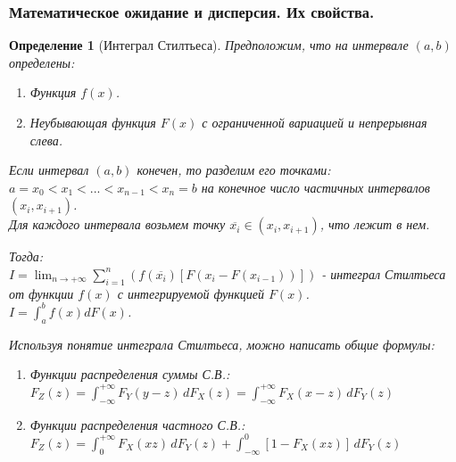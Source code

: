 \documentclass[14pt]{extarticle}
\theoremstyle{breakstyle}
\newtheorem{definition}{Определение}[subsection]
\begin{document}
\subsubsection{Математическое ожидание и дисперсия. Их свойства.}
\begin{definition}[Интеграл Стилтьеса]
Предположим, что на интервале $(a, b)$ определены:
\begin{enumerate}
    \item Функция $f(x)$.
    \item Неубывающая функция $F(x)$ с ограниченной вариацией и непрерывная слева.
\end{enumerate}

Если интервал $(a, b)$ конечен, то разделим его точками: $a = x_{0} < x_{1} < ... < x_{n-1} < x_{n} = b$ на конечное число частичных интервалов $(x_{i}, x_{i+1})$.\\
Для каждого интервала возьмем точку $\overline{x_{i}} \in (x_{i}, x_{i+1})$, что лежит в нем.

\vspace{\baselineskip}

Тогда:\\
$I = \lim_{n \to +\infty}\sum_{i=1}^{n}(f(\overline{x_{i}})[F(x_{i} - F(x_{i-1}))])$ - интеграл Стилтьеса от функции $f(x)$ с интегрируемой функцией $F(x)$.\\
$I = \int_{a}^{b} f(x) dF(x)$.

\vspace{\baselineskip}

Используя понятие интеграла Стилтьеса, можно написать общие формулы:
\begin{enumerate}
    \item Функции распределения суммы С.В.: $F_{Z}(z) = \int_{-\infty}^{+\infty} F_{Y}(y - z) \, dF_{X}(z) = \int_{-\infty}^{+\infty} F_{X}(x - z) \, dF_{Y}(z)$
    \item Функции распределения частного С.В.: $F_{Z}(z) = \int_{0}^{+\infty} F_{X}(xz) \, dF_{Y}(z) + \int_{-\infty}^{0}[1 - F_{X}(xz)] \, dF_{Y}(z)$
\end{enumerate}

\end{definition}
\end{document}
